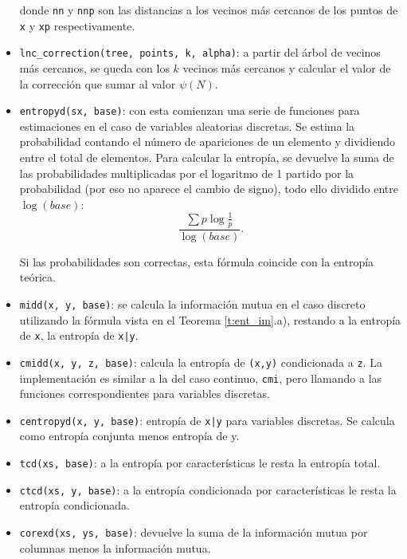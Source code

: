 \documentclass[12pt,a4paper]{report} %
\theoremstyle{definition}
\begin{document}
\begin{itemize}
donde \texttt{nn} y \texttt{nnp} son las distancias a los vecinos más cercanos de los puntos de \texttt{x} y \texttt{xp} respectivamente.

\item \texttt{lnc\_correction(tree, points, k, alpha)}: a partir del árbol de vecinos más cercanos, se queda con los $k$ vecinos más cercanos y calcular el valor de la corrección que sumar al valor $\psi(N)$.

\item \texttt{entropyd(sx, base)}: con esta comienzan una serie de funciones para estimaciones en el caso de variables aleatorias discretas. Se estima la probabilidad contando el número de apariciones de un elemento y dividiendo entre el total de elementos. Para calcular la entropía, se devuelve la suma de las probabilidades multiplicadas por el logaritmo de 1 partido por la probabilidad (por eso no aparece el cambio de signo), todo ello dividido entre $\log (base)$:\[
\frac{\sum p \log \frac{1}{p}}{\log(base)}.
\]

Si las probabilidades son correctas, esta fórmula coincide con la entropía teórica.

\item \texttt{midd(x, y, base)}: se calcula la información mutua en el caso discreto utilizando la fórmula vista en el Teorema \ref{t:ent_im}.a), restando a la entropía de \texttt{x}, la entropía de \texttt{x|y}.

\item \texttt{cmidd(x, y, z, base)}: calcula la entropía de \texttt{(x,y)} condicionada a \texttt{z}. La implementación es similar a la del caso continuo, \texttt{cmi}, pero llamando a las funciones correspondientes para variables discretas.

\item \texttt{centropyd(x, y, base)}: entropía de \texttt{x|y} para variables discretas. Se calcula como entropía conjunta menos entropía de y.

\item \texttt{tcd(xs, base)}: a la entropía por características le resta la entropía total.

\item \texttt{ctcd(xs, y, base)}:  a la entropía condicionada por características le resta la entropía condicionada.

\item \texttt{corexd(xs, ys, base)}: devuelve la suma de la información mutua por columnas menos la información mutua.


\end{itemize}
\end{document}
